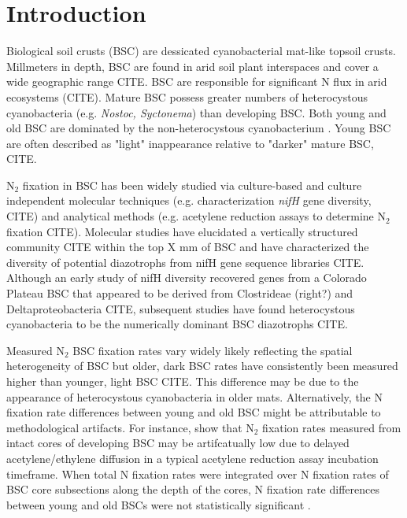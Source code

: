 \section{Introduction}


Biological soil crusts (BSC) are dessicated cyanobacterial mat-like topsoil crusts. Millmeters in depth, BSC are found in arid soil plant interspaces and cover a wide geographic range CITE. BSC are responsible for significant N flux in arid ecosystems (CITE). Mature BSC possess greater numbers of heterocystous cyanobacteria (e.g. \textit{Nostoc, Syctonema}) than developing BSC. Both young and old BSC are dominated by the non-heterocystous cyanobacterium . Young BSC are often described as "light" inappearance relative to "darker" mature BSC, CITE.

N$_{2}$ fixation in BSC has been widely studied via culture-based and culture independent molecular techniques (e.g. characterization \textit{nifH} gene diversity, CITE) and analytical methods (e.g. acetylene reduction assays to determine N$_{2}$ fixation CITE). Molecular studies have elucidated a vertically structured community CITE within the top X mm of BSC and have characterized the diversity of potential diazotrophs from nifH gene sequence libraries CITE. Although an early study of nifH diversity recovered genes from a Colorado Plateau BSC that appeared to be derived from Clostrideae (right?) and Deltaproteobacteria CITE, subsequent studies have found heterocystous cyanobacteria to be the numerically dominant BSC diazotrophs CITE. 

Measured N$_{2}$ BSC fixation rates vary widely likely reflecting the spatial heterogeneity of BSC but older, dark BSC rates have consistently been measured higher than younger, light BSC CITE. This difference may be due to the appearance of heterocystous cyanobacteria in older mats. Alternatively, the N fixation rate differences between young and old BSC might be attributable to methodological artifacts. For instance, \citet{15643930} show that N$_{2}$ fixation rates measured from intact cores of developing BSC may be artifcatually low due to delayed acetylene/ethylene diffusion in a typical acetylene reduction assay incubation timeframe. When total N fixation rates were integrated over N fixation rates of BSC core subsections along the depth of the cores, N fixation rate differences between young and old BSCs were not statistically significant \cite{15643930}.

